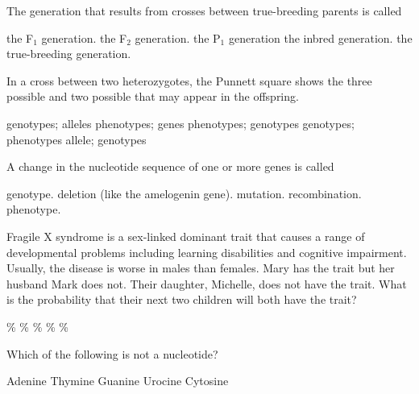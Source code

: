 \question
The generation that results from crosses between true-breeding parents is called

\begin{choices}
\correctchoice the F$_1$ generation.%
\choice the F$_2$ generation.%
\choice the P$_1$ generation%
\choice the inbred generation.%
\choice the true-breeding generation.%
\end{choices}

\question
In a cross between two heterozygotes, the Punnett square shows the three possible \underline{\hspace{2cm}} and two possible \underline{\hspace{2cm}} that may appear in the offspring.

\begin{choices}
\choice genotypes; alleles%
\choice phenotypes; genes%
\choice phenotypes; genotypes%
\correctchoice genotypes; phenotypes%
\choice allele; genotypes%
\end{choices}


\question
A change in the nucleotide sequence of one or more genes is called

\begin{choices}
\choice genotype.%
\choice deletion (like the amelogenin gene).%
\correctchoice mutation.%
\choice recombination.%
\choice phenotype.%
\end{choices}


\question
Fragile X syndrome is a sex-linked dominant trait that causes a range of developmental problems including learning disabilities and cognitive impairment.  Usually, the disease is worse in males than females.  Mary has the trait but her husband Mark does not. Their daughter, Michelle, does not have the trait. What is the probability that their next two children will both have the trait?

\begin{choices}
\%%
\%%
\%%
\%%
\%%
\end{choices}


\question
Which of the following is not a nucleotide?

\begin{choices}
\choice Adenine%
\choice Thymine%
\choice Guanine%
\correctchoice Urocine%
\choice Cytosine%
\end{choices}


